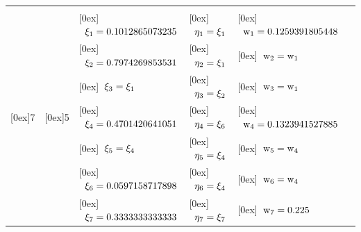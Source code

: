 \begin{table}[ht]
\begin{tabular}{|c|c|l|l|l|l|}
                                                               &                                         &                                                             &                                                               &                                                              \\
                                                               &                                         & \raisebox{0.2cm}[0ex]{$\;\;\rm \xi_1 = 0.10128 65073 235   $} & \raisebox{0.2cm}[0ex]{$\;\;\rm  \eta_1 = \xi_1       $}            & \raisebox{0.2cm}[0ex]{$\;\;\rm w_1 = 0.12593 91805 448 $}    \\
                                                               &                                         & \raisebox{0.2cm}[0ex]{$\;\;\rm \xi_2 = 0.79742 69853 531   $} & \raisebox{0.2cm}[0ex]{$\;\;\rm  \eta_2 = \xi_1       $}            & \raisebox{0.2cm}[0ex]{$\;\;\rm w_2 = w_1 $}                  \\
                                                               &                                         & \raisebox{0.2cm}[0ex]{$\;\;\rm \xi_3 = \xi_1                 $} & \raisebox{0.2cm}[0ex]{$\;\;\rm  \eta_3 = \xi_2       $}            & \raisebox{0.2cm}[0ex]{$\;\;\rm w_3 = w_1 $}                  \\
\raisebox{0.2cm}[0ex]{7}                                       & \raisebox{0.2cm}[0ex]{5}                & \raisebox{0.2cm}[0ex]{$\;\;\rm \xi_4 = 0.47014 20641 051   $} & \raisebox{0.2cm}[0ex]{$\;\;\rm  \eta_4 = \xi_6       $}            & \raisebox{0.2cm}[0ex]{$\;\;\rm w_4 = 0.13239 41527 885 $}    \\
                                                               &                                         & \raisebox{0.2cm}[0ex]{$\;\;\rm \xi_5 = \xi_4                 $} & \raisebox{0.2cm}[0ex]{$\;\;\rm  \eta_5 = \xi_4       $}            & \raisebox{0.2cm}[0ex]{$\;\;\rm w_5 = w_4 $}                  \\
                                                               &                                         & \raisebox{0.2cm}[0ex]{$\;\;\rm \xi_6 = 0.05971 58717 898   $} & \raisebox{0.2cm}[0ex]{$\;\;\rm  \eta_6 = \xi_4       $}            & \raisebox{0.2cm}[0ex]{$\;\;\rm w_6 = w_4 $}                  \\
                                                               &                                         & \raisebox{0.2cm}[0ex]{$\;\;\rm \xi_7 = 0.33333 33333 333   $} & \raisebox{0.2cm}[0ex]{$\;\;\rm  \eta_7 = \xi_7       $}            & \raisebox{0.2cm}[0ex]{$\;\;\rm w_7 = 0.225 $}                \\ 


\end{tabular}
\end{table}
